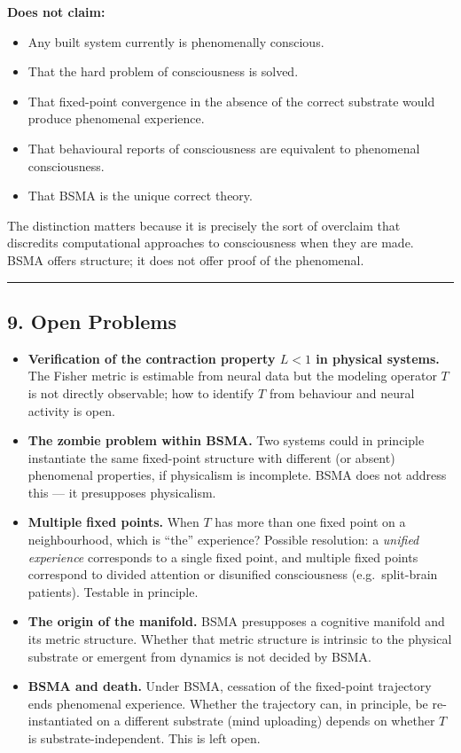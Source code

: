 \documentclass[
  11pt,
  a4paper,
]{article}
\providecommand{\tightlist}{%
  \setlength{\itemsep}{0pt}\setlength{\parskip}{0pt}}
\begin{document}
\textbf{Does not claim:}

\begin{itemize}
\tightlist
\item
  Any built system currently is phenomenally conscious.
\item
  That the hard problem of consciousness is solved.
\item
  That fixed-point convergence in the absence of the correct substrate
  would produce phenomenal experience.
\item
  That behavioural reports of consciousness are equivalent to phenomenal
  consciousness.
\item
  That BSMA is the unique correct theory.
\end{itemize}

The distinction matters because it is precisely the sort of overclaim
that discredits computational approaches to consciousness when they are
made. BSMA offers structure; it does not offer proof of the phenomenal.

\begin{center}\rule{0.5\linewidth}{0.5pt}\end{center}

\subsection{9. Open Problems}\label{open-problems}

\begin{itemize}
\tightlist
\item
  \textbf{Verification of the contraction property \(L < 1\) in physical
  systems.} The Fisher metric is estimable from neural data but the
  modeling operator \(T\) is not directly observable; how to identify
  \(T\) from behaviour and neural activity is open.
\item
  \textbf{The zombie problem within BSMA.} Two systems could in
  principle instantiate the same fixed-point structure with different
  (or absent) phenomenal properties, if physicalism is incomplete. BSMA
  does not address this --- it presupposes physicalism.
\item
  \textbf{Multiple fixed points.} When \(T\) has more than one fixed
  point on a neighbourhood, which is ``the'' experience? Possible
  resolution: a \emph{unified experience} corresponds to a single fixed
  point, and multiple fixed points correspond to divided attention or
  disunified consciousness (e.g.~split-brain patients). Testable in
  principle.
\item
  \textbf{The origin of the manifold.} BSMA presupposes a cognitive
  manifold and its metric structure. Whether that metric structure is
  intrinsic to the physical substrate or emergent from dynamics is not
  decided by BSMA.
\item
  \textbf{BSMA and death.} Under BSMA, cessation of the fixed-point
  trajectory ends phenomenal experience. Whether the trajectory can, in
  principle, be re-instantiated on a different substrate (mind
  uploading) depends on whether \(T\) is substrate-independent. This is
  left open.
\end{itemize}
\end{document}
